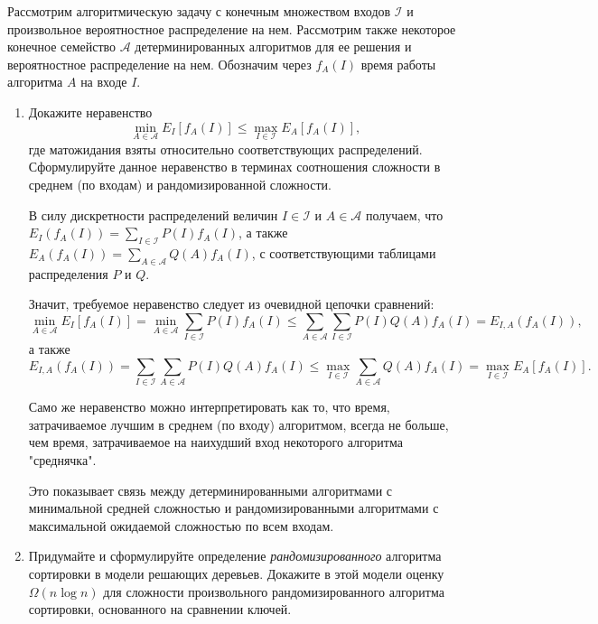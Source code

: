 \documentclass[11pt]{article}
\renewcommand{\le}{\leqslant}   %
\begin{document}
\begin{problem}{30}
	Рассмотрим алгоритмическую задачу с конечным множеством входов $\mathcal{I}$ и произвольное вероятностное распределение на нем. Рассмотрим также некоторое конечное семейство $\mathcal{A}$ детерминированных алгоритмов для ее решения
	и вероятностное распределение на нем. Обозначим через $f_A(I)$ время работы алгоритма
	$A$ на входе $I$.
	
	\begin{enumerate}
		\item Докажите неравенство
			  $$
				  \min_{A \in \mathcal{A}} E_I\left[ f_A(I) \right] \le \max_{I \in \mathcal{I}} E_A\left[ f_A(I) \right],
			  $$
			  где матожидания взяты относительно соответствующих распределений.
			  Сформулируйте данное неравенство в терминах соотношения сложности в среднем (по входам) и рандомизированной сложности.
	
			  \begin{solution}
				  В силу дискретности распределений величин $I \in \mathcal{I} $ и $A \in \mathcal{A} $ получаем, что $ E_I(f_A(I)) = \sum_{I \in \mathcal{I}} P(I) f_A(I) $, а также $ E_A(f_A(I)) = \sum_{A \in \mathcal{A}} Q(A) f_A(I) $, с соответствующими таблицами распределения $ P $ и $ Q $.
	
				  Значит, требуемое неравенство следует из очевидной цепочки сравнений:
				  $$
					  \min_{A \in \mathcal{A}} E_I\left[ f_A(I) \right] = \min_{A \in \mathcal{A}} \sum_{I \in \mathcal{I}} P(I) f_A(I) \le \sum_{A \in \mathcal{A}} \sum_{I \in \mathcal{I}} P(I) Q(A) f_A(I) = E_{I, A}(f_A(I)),
				  $$
				  а также
				  $$
					  E_{I, A}(f_A(I)) = \sum_{I \in \mathcal{I}} \sum_{A \in \mathcal{A}} P(I) Q(A) f_A(I) \le \max_{I \in \mathcal{I}} \sum_{A \in \mathcal{A}} Q(A) f_A(I) = \max_{I \in \mathcal{I}} E_A\left[ f_A(I) \right].
				  $$
	
				  Само же неравенство можно интерпретировать как то, что время, затрачиваемое лучшим в среднем (по входу) алгоритмом, всегда не больше, чем время, затрачиваемое на наихудший вход некоторого алгоритма "среднячка".
	
				  Это показывает связь между детерминированными алгоритмами с минимальной средней сложностью и рандомизированными алгоритмами с максимальной ожидаемой сложностью по всем входам.
			  \end{solution}
	
		\item Придумайте и сформулируйте определение \emph{рандомизированного} алгоритма сортировки в модели решающих деревьев.
		Докажите в этой модели оценку $\Omega(n \log n)$ для сложности произвольного рандомизированного      алгоритма сортировки, основанного на сравнении ключей.
	

\end{enumerate}
\end{problem}
\end{document}
